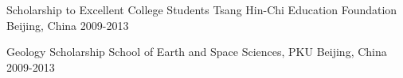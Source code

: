 %
%


\begin{cvhonors}

  \cvhonor
    {Scholarship to Excellent College Students} %
    {Tsang Hin-Chi Education Foundation} %
    {Beijing, China} %
    {2009-2013} %
    
\cvhonor
	{Geology Scholarship} %
	{School of Earth and Space Sciences, PKU} %
	{Beijing, China} %
	{2009-2013} %


\end{cvhonors}


